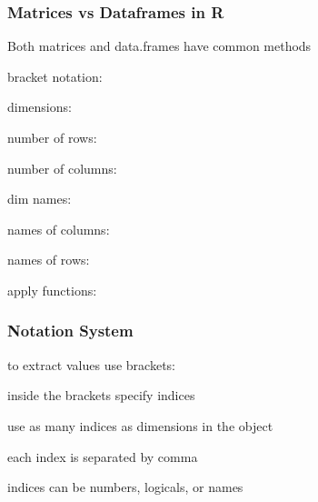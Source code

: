 \documentclass[12pt]{beamer}\usepackage[]{graphicx}\usepackage[]{color}
\begin{document}
\begin{frame}
\frametitle{Matrices vs Dataframes in R}

Both matrices and data.frames have common methods

\bi
  \item bracket notation: {\mdlit \code{[ , ]}}
  \item dimensions: {\mdlit {}}
  \item number of rows: {\mdlit {}}
  \item number of columns: {\mdlit {}}
  \item dim names: {\mdlit {}}
  \item names of columns: {\mdlit {}}
  \item names of rows: {\mdlit {}}
  \item apply functions: {\mdlit {}}
\ei

\end{frame}


\begin{frame}
\frametitle{Notation System}

\bbi
  \item to extract values use brackets: \code{[ ]}
  \item inside the brackets specify indices
  \item use as many indices as dimensions in the object
  \item each index is separated by comma
  \item indices can be numbers, logicals, or names
\ei
\eb
\end{frame}

\end{document}
